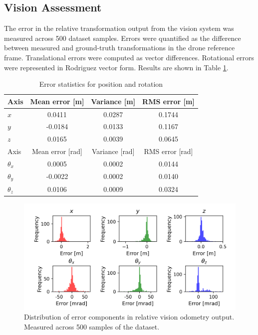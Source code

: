 \documentclass[bare_jrnl_transmag]{subfiles}
\begin{document}
\subsection{Vision Assessment}
The error in the relative transformation output from the vision system was measured across 500 dataset samples. Errors were quantified as the difference between measured and ground-truth transformations in the drone reference frame. Translational errors were computed as vector differences. Rotational errors were represented in Rodriguez vector form. Results are shown in Table \ref{tab:vision-error-stats}.

\begin{table}[H]
    \centering
    \begin{tabular}{lccc}
    \hline
    Axis & Mean error [m] & Variance [m] & RMS error [m] \\ \hline
    $x$ & 0.0411 & 0.0287 & 0.1744 \\
    $y$ & -0.0184 & 0.0133 & 0.1167 \\
    $z$ & 0.0165 & 0.0039 & 0.0645 \\ \hline
    Axis & Mean error [rad] & Variance [rad] & RMS error [rad] \\ \hline
    $\theta_x$ & 0.0005 & 0.0002 & 0.0144 \\
    $\theta_y$ & -0.0022 & 0.0002 & 0.0140 \\
    $\theta_z$ & 0.0106 & 0.0009 & 0.0324 \\ \hline
    \end{tabular}
    \caption{Error statistics for position and rotation}
    \label{tab:vision-error-stats}
\end{table}

\begin{figure}[H]
    \centering
    \includegraphics[width=0.9\linewidth]{figures/vision_error.png}
    \caption{Distribution of error components in relative vision odometry output. Measured across 500 samples of the dataset.}
    \label{fig:vision-error-results}
\end{figure}
\end{document}
